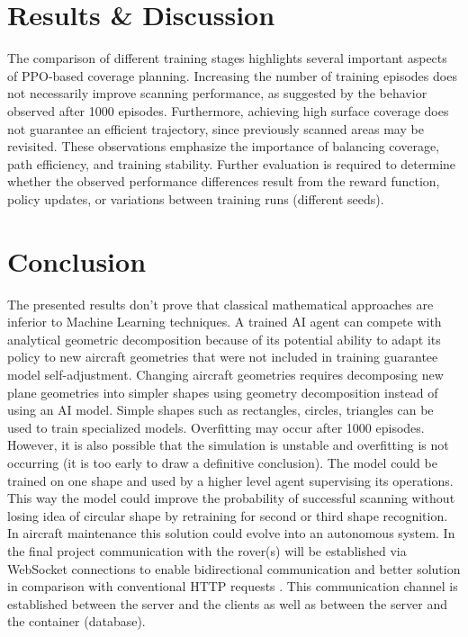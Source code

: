 \documentclass[11pt,a4paper,oneside,onecolumn]{article}
\begin{document}
\section{Results \& Discussion}
The comparison of different training stages highlights several important aspects of PPO-based coverage planning. Increasing the number of training episodes does not necessarily improve scanning performance, as suggested by the behavior observed after 1000 episodes. Furthermore, achieving high surface coverage does not guarantee an efficient trajectory, since previously scanned areas may be revisited. These observations emphasize the importance of balancing coverage, path efficiency, and training stability. Further evaluation is required to determine whether the observed performance differences result from the reward function, policy updates, or variations between training runs (different seeds).

\section{Conclusion}

The presented results don't prove that classical mathematical approaches are inferior to Machine Learning techniques. A trained AI agent can compete with analytical geometric decomposition because of its potential ability to adapt its policy to new aircraft geometries that were not included in training guarantee model self-adjustment. Changing aircraft geometries requires decomposing new plane geometries into simpler shapes using geometry decomposition instead of using an AI model. Simple shapes such as rectangles, circles, triangles can be used to train specialized models. Overfitting may occur after 1000 episodes. However, it is also possible that the simulation is unstable and overfitting is not occurring (it is too early to draw a definitive conclusion). The model could be trained on one shape and used by a higher level agent supervising its operations. This way the model could improve the probability of successful scanning without losing idea of circular shape by retraining for second or third shape recognition. In aircraft maintenance this solution could evolve into an autonomous system. In the final project communication with the rover(s) will be established via WebSocket connections to enable bidirectional communication and better solution in comparison with conventional HTTP requests \cite{kufa2025pathplanning}. This communication channel is established between the server and the clients as well as between the server and the container (database).




\end{document}
